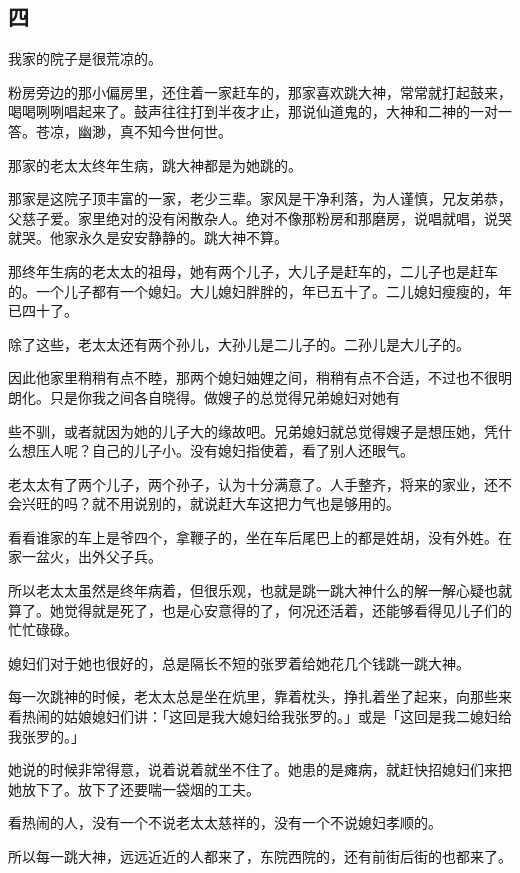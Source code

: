 \documentclass[UTF8]{ctexart}
\begin{document}
\subsection{四}

{我家的院子是很荒凉的。}

粉房旁边的那小偏房里，还住着一家赶车的，那家喜欢跳大神，常常就打起鼓来，喝喝咧咧唱起来了。鼓声往往打到半夜才止，那说仙道鬼的，大神和二神的一对一答。苍凉，幽渺，真不知今世何世。

那家的老太太终年生病，跳大神都是为她跳的。

那家是这院子顶丰富的一家，老少三辈。家风是干净利落，为人谨慎，兄友弟恭，父慈子爱。家里绝对的没有闲散杂人。绝对不像那粉房和那磨房，说唱就唱，说哭就哭。他家永久是安安静静的。跳大神不算。

那终年生病的老太太的祖母，她有两个儿子，大儿子是赶车的，二儿子也是赶车的。一个儿子都有一个媳妇。大儿媳妇胖胖的，年已五十了。二儿媳妇瘦瘦的，年已四十了。

除了这些，老太太还有两个孙儿，大孙儿是二儿子的。二孙儿是大儿子的。

因此他家里稍稍有点不睦，那两个媳妇妯娌之间，稍稍有点不合适，不过也不很明朗化。只是你我之间各自晓得。做嫂子的总觉得兄弟媳妇对她有

些不驯，或者就因为她的儿子大的缘故吧。兄弟媳妇就总觉得嫂子是想压她，凭什么想压人呢？自己的儿子小。没有媳妇指使着，看了别人还眼气。

老太太有了两个儿子，两个孙子，认为十分满意了。人手整齐，将来的家业，还不会兴旺的吗？就不用说别的，就说赶大车这把力气也是够用的。

看看谁家的车上是爷四个，拿鞭子的，坐在车后尾巴上的都是姓胡，没有外姓。在家一盆火，出外父子兵。

所以老太太虽然是终年病着，但很乐观，也就是跳一跳大神什么的解一解心疑也就算了。她觉得就是死了，也是心安意得的了，何况还活着，还能够看得见儿子们的忙忙碌碌。

媳妇们对于她也很好的，总是隔长不短的张罗着给她花几个钱跳一跳大神。

每一次跳神的时候，老太太总是坐在炕里，靠着枕头，挣扎着坐了起来，向那些来看热闹的姑娘媳妇们讲：「这回是我大媳妇给我张罗的。」或是「这回是我二媳妇给我张罗的。」

她说的时候非常得意，说着说着就坐不住了。她患的是瘫病，就赶快招媳妇们来把她放下了。放下了还要喘一袋烟的工夫。

看热闹的人，没有一个不说老太太慈祥的，没有一个不说媳妇孝顺的。

所以每一跳大神，远远近近的人都来了，东院西院的，还有前街后街的也都来了。
\end{document}
